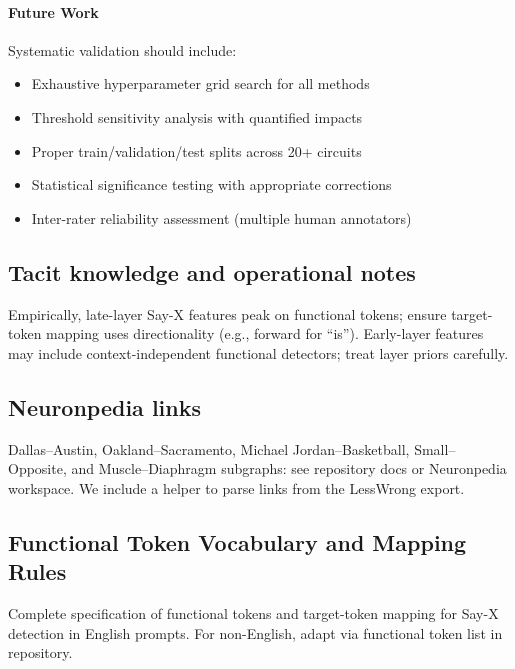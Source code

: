 \paragraph{Future Work}
Systematic validation should include:
\begin{itemize}
  \item Exhaustive hyperparameter grid search for all methods
  \item Threshold sensitivity analysis with quantified impacts
  \item Proper train/validation/test splits across 20+ circuits
  \item Statistical significance testing with appropriate corrections
  \item Inter-rater reliability assessment (multiple human annotators)
\end{itemize}

\subsection{Tacit knowledge and operational notes}
Empirically, late-layer Say-X features peak on functional tokens; ensure target-token mapping uses directionality (e.g., forward for ``is''). Early-layer features may include context-independent functional detectors; treat layer priors carefully.

\subsection{Neuronpedia links}
Dallas--Austin, Oakland--Sacramento, Michael Jordan--Basketball, Small--Opposite, and Muscle--Diaphragm subgraphs: see repository docs or Neuronpedia workspace. We include a helper to parse links from the LessWrong export.

\subsection{Functional Token Vocabulary and Mapping Rules}
\label{sec:functional-vocab}

Complete specification of functional tokens and target-token mapping for Say-X detection in English prompts. For non-English, adapt via functional token list in repository.

